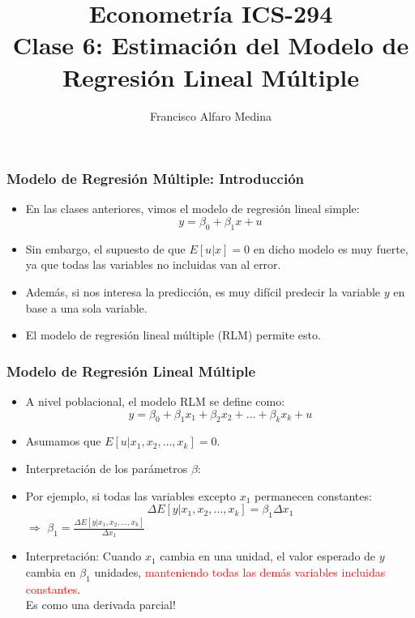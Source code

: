 \documentclass{beamer}
\title[ICS-162]{Econometría ICS-294\\ \small{Clase 6: Estimación del Modelo de Regresión Lineal Múltiple}}
\author{Francisco Alfaro Medina}
\institute[USM]
{Universidad Técnica Federico Santa María\\ %
	\medskip
	\textit{} %
	
}
\date{}
\begin{document}
	
\begin{frame}
	\titlepage %


\end{frame}

\logo{}



\begin{frame}
	\frametitle{Modelo de Regresión Múltiple: Introducción}
	\begin{itemize}
				\item En las clases anteriores, vimos el modelo de regresión lineal simple:
		\[ y = \beta_0 + \beta_1x + u \]
		\item Sin embargo, el supuesto de que $E[u|x] = 0$ en dicho modelo es muy fuerte, ya que todas las variables no incluidas van al error.
			\item Además, si nos interesa la predicción, es muy difícil predecir la variable $y$ en base a una sola variable.
		\item El modelo de regresión lineal múltiple (RLM) permite esto.
	\end{itemize}
\end{frame}
\begin{frame}
	\frametitle{Modelo de Regresión Lineal Múltiple}
	\begin{itemize}
		\item A nivel poblacional, el modelo RLM se define como:
		\[ y = \beta_0 + \beta_1x_1 + \beta_2x_2 + \ldots + \beta_kx_k + u \]
		\item Asumamos que $E[u|x_1, x_2, \ldots, x_k] = 0$.
		\item Interpretación de los parámetros $\beta$:
		\item Por ejemplo, si todas las variables excepto $x_1$ permanecen constantes:
		\[ \Delta E[y|x_1, x_2, \ldots, x_k] = \beta_1 \Delta x_1 \]
		$\Rightarrow$ $\beta_1 = \frac{\Delta E[y|x_1, x_2, \ldots, x_k]}{\Delta x_1}$
		\item Interpretación: Cuando $x_1$ cambia en una unidad, el valor esperado de $y$ cambia en $\beta_1$ unidades, \textcolor{red}{manteniendo todas las demás variables incluidas constantes}. \\ Es como una derivada parcial!
	\end{itemize}
\end{frame}
\end{document}
